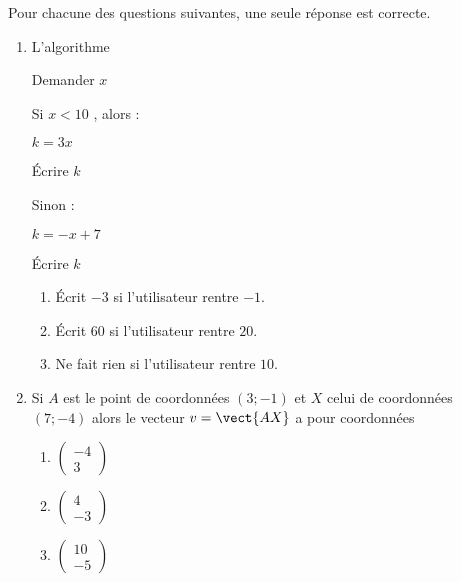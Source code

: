 
\begin{exercice}[\ldots/4]\label{exosmath-0630}

    Pour chacune des questions suivantes, une seule réponse est correcte.
    \begin{multicols}{2}
    \begin{enumerate}
        \item
           L'algorithme

    \begin{fmpage}{0.9\linewidth}

        Demander \( x\)

    Si  \( x< 10\) , alors :

    \hspace{0.5cm} \( k=3x\)

    \hspace{0.5cm} Écrire \( k\) 

    Sinon :

    \hspace{0.5cm} \( k=-x+7\)

    \hspace{0.5cm} Écrire \( k\) 

\end{fmpage}

    \begin{enumerate}
        \item
            Écrit \( -3\) si l'utilisateur rentre \( -1\).
        \item
            Écrit \( 60 \) si l'utilisateur rentre \( 20\).
        \item
            Ne fait rien si l'utilisateur rentre \( 10\).
    \end{enumerate}
    
\item

    Si \( A\) est le point de coordonnées \( (3;-1)\) et \( X\) celui de coordonnées \( (7;-4)\) alors le vecteur \( v=\vect{ AX }\) a pour coordonnées
    \begin{enumerate}
        \item
            \( \begin{pmatrix}
                -4    \\ 
                3    
            \end{pmatrix}\)
        \item
            \( \begin{pmatrix}
                4    \\ 
                -3    
            \end{pmatrix}\)
        \item
            \( \begin{pmatrix}
                10    \\ 
                -5    
            \end{pmatrix}\)
    \end{enumerate}
    

\end{enumerate}
\end{multicols}
\end{exercice}
